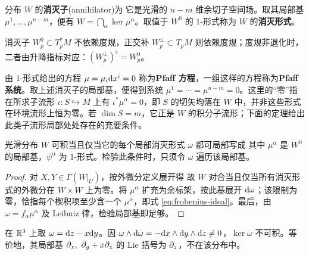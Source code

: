 \begin{definition}
    分布 $W$ 的\textbf{消灭子}(annihilator)为
    它是光滑的 $n-m$ 维余切子空间场。取其局部基 $\mu^1,\ldots,\mu^{n-m}$，便有 $W=\bigcap_\alpha\ker\mu^\alpha$。取值于 $W^0$ 的 $1$-形式称为 $W$ 的\textbf{消灭形式}。
\end{definition}

消灭子 $W_p^0\subset T_p^*M$ 不依赖度规，正交补 $W_p^\perp\subset T_pM$ 则依赖度规；度规非退化时，二者由升降指标对应：$(W_p^\perp)^\flat=W_p^0$。

\begin{example}[Pfaff 系统]
    由 $1$-形式给出的方程 $\mu=\mu_i\dd x^i=0$ 称为\textbf{Pfaff 方程}，一组这样的方程称为\textbf{Pfaff 系统}。取上述消灭子的局部基，便得到系统 $\mu^1=\cdots=\mu^{n-m}=0$。这里的“零”指在所求子流形 $\iota:S\hookrightarrow M$ 上有 $\iota^*\mu^\alpha=0$，即 $S$ 的切矢均落在 $W$ 中，并非这些形式在环境流形上恒为零。若 $\dim S=m$，它正是 $W$ 的积分子流形；下面的定理给出此类子流形局部处处存在的充要条件。
\end{example}

\begin{theorem}
    光滑分布 $W$ 可积当且仅当它的每个局部消灭形式 $\omega$ 都可局部写成
    其中 $\mu^\alpha$ 是 $W^0$ 的局部基，$\psi^\alpha$ 为 $1$-形式。检验此条件时，只须令 $\omega$ 遍历该局部基。
\end{theorem}
\begin{proof}
    对 $X,Y\in\Gamma(W|_U)$，按外微分定义展开得
    故 $W$ 对合当且仅当所有消灭形式的外微分在 $W\times W$ 上为零。将 $\mu^\alpha$ 扩充为余标架，按此基展开 $\dd\omega$；该限制为零，恰指每个楔积项至少含一个 $\mu^\alpha$，即式 \eqref{eq:frobenius-ideal}。最后，由 $\omega=f_\alpha\mu^\alpha$ 及 Leibniz 律，检验局部基即足够。
\end{proof}

\begin{example}
    在 $\mathbb{R}^3$ 上取 $\omega=\dd z-x\dd y$。因
    $\omega\wedge\dd\omega=-\dd x\wedge\dd y\wedge\dd z\ne0$，$\ker\omega$ 不可积。等价地，其局部基 $\p_x,\ \p_y+x\p_z$ 的 Lie 括号为 $\partial_z$，不在该分布中。
\end{example}

